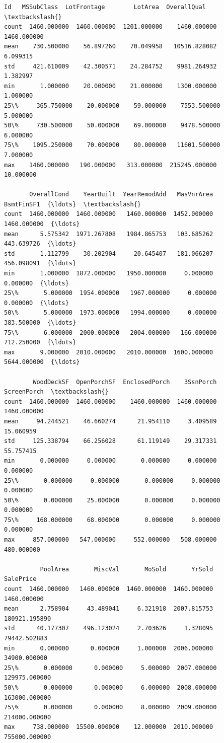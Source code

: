 \documentclass[11pt]{article}
\makeatletter
\newcommand{\boxspacing}{\kern\kvtcb@left@rule\kern\kvtcb@boxsep}
\newcommand{\prompt}[4]{
        {\ttfamily\llap{{\color{#2}[#3]:\hspace{3pt}#4}}\vspace{-\baselineskip}}
    }
\makeatother
\begin{document}
            \begin{tcolorbox}[breakable, size=fbox, boxrule=.5pt, pad at break*=1mm, opacityfill=0]
\prompt{Out}{outcolor}{5}{\boxspacing}
\begin{Verbatim}[commandchars=\\\{\}]
                Id   MSSubClass  LotFrontage        LotArea  OverallQual  \textbackslash{}
count  1460.000000  1460.000000  1201.000000    1460.000000  1460.000000
mean    730.500000    56.897260    70.049958   10516.828082     6.099315
std     421.610009    42.300571    24.284752    9981.264932     1.382997
min       1.000000    20.000000    21.000000    1300.000000     1.000000
25\%     365.750000    20.000000    59.000000    7553.500000     5.000000
50\%     730.500000    50.000000    69.000000    9478.500000     6.000000
75\%    1095.250000    70.000000    80.000000   11601.500000     7.000000
max    1460.000000   190.000000   313.000000  215245.000000    10.000000

       OverallCond    YearBuilt  YearRemodAdd   MasVnrArea   BsmtFinSF1  {\ldots}  \textbackslash{}
count  1460.000000  1460.000000   1460.000000  1452.000000  1460.000000  {\ldots}
mean      5.575342  1971.267808   1984.865753   103.685262   443.639726  {\ldots}
std       1.112799    30.202904     20.645407   181.066207   456.098091  {\ldots}
min       1.000000  1872.000000   1950.000000     0.000000     0.000000  {\ldots}
25\%       5.000000  1954.000000   1967.000000     0.000000     0.000000  {\ldots}
50\%       5.000000  1973.000000   1994.000000     0.000000   383.500000  {\ldots}
75\%       6.000000  2000.000000   2004.000000   166.000000   712.250000  {\ldots}
max       9.000000  2010.000000   2010.000000  1600.000000  5644.000000  {\ldots}

        WoodDeckSF  OpenPorchSF  EnclosedPorch    3SsnPorch  ScreenPorch  \textbackslash{}
count  1460.000000  1460.000000    1460.000000  1460.000000  1460.000000
mean     94.244521    46.660274      21.954110     3.409589    15.060959
std     125.338794    66.256028      61.119149    29.317331    55.757415
min       0.000000     0.000000       0.000000     0.000000     0.000000
25\%       0.000000     0.000000       0.000000     0.000000     0.000000
50\%       0.000000    25.000000       0.000000     0.000000     0.000000
75\%     168.000000    68.000000       0.000000     0.000000     0.000000
max     857.000000   547.000000     552.000000   508.000000   480.000000

          PoolArea       MiscVal       MoSold       YrSold      SalePrice
count  1460.000000   1460.000000  1460.000000  1460.000000    1460.000000
mean      2.758904     43.489041     6.321918  2007.815753  180921.195890
std      40.177307    496.123024     2.703626     1.328095   79442.502883
min       0.000000      0.000000     1.000000  2006.000000   34900.000000
25\%       0.000000      0.000000     5.000000  2007.000000  129975.000000
50\%       0.000000      0.000000     6.000000  2008.000000  163000.000000
75\%       0.000000      0.000000     8.000000  2009.000000  214000.000000
max     738.000000  15500.000000    12.000000  2010.000000  755000.000000


\end{Verbatim}
\end{tcolorbox}
\end{document}
